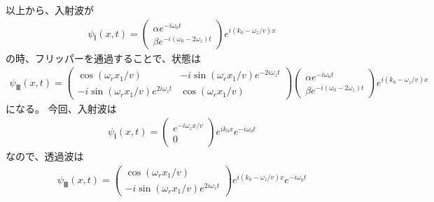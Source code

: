 以上から、入射波が
\begin{align}
{\psi}_{Ⅰ}(x,t)=
\begin{pmatrix}
{\alpha}e^{-i\omega_{0}t} \\
{\beta}e^{-i(\omega_{0}-2\omega_{z})t}
\end{pmatrix}
e^{i(k_{0}-\omega_{z}/v)x}
\end{align}
の時、フリッパーを通過することで、状態は
\begin{align}
{\psi}_{Ⅲ}(x,t) 
=
\begin{pmatrix}
\cos({{\omega_{r}}x_{1}/v}) &-i\sin({{\omega_{r}}x_{1}/v})e^{-2i\omega_{z}t} \\
-i\sin({{\omega_{r}}x_{1}/v})e^{2i\omega_{z}t} &\cos({{\omega_{r}}x_{1}/v})
\end{pmatrix}\begin{pmatrix}
{\alpha}e^{-i\omega_{0}t} \\
{\beta}e^{-i(\omega_{0}-2\omega_{z})t}
\end{pmatrix}
e^{i(k_{0}-\omega_{z}/v)x}
\end{align}
になる。
今回、入射波は
\begin{align}
{\psi}_{Ⅰ}(x,t)=
\begin{pmatrix}
e^{-i\omega_{z}x/v} \\
0
\end{pmatrix}
e^{ik_{0}x}e^{-i\omega_{0}t}
\end{align}
なので、透過波は
\begin{align}
{\psi}_{Ⅲ}(x,t)=
\begin{pmatrix}
\cos({{\omega_{r}}x_{1}/v}) \\
-i\sin({{\omega_{r}}x_{1}/v})e^{2i\omega_{z}t}
\end{pmatrix}
e^{i(k_{0}-\omega_{z}/v)x}e^{-i\omega_{0}t}
\end{align}





